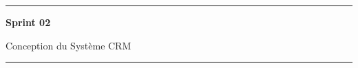 \newpage
\thispagestyle{empty}
\vspace*{\fill}
\begin{center}
\rule{0.8\textwidth}{0.5pt}

\vspace{1cm}
{\Huge\bfseries Sprint 02}

\vspace{0.5cm}
{\LARGE Conception du Système CRM}
\vspace{1cm}

\rule{0.8\textwidth}{0.5pt}
\end{center}
\vspace*{\fill}
\newpage
